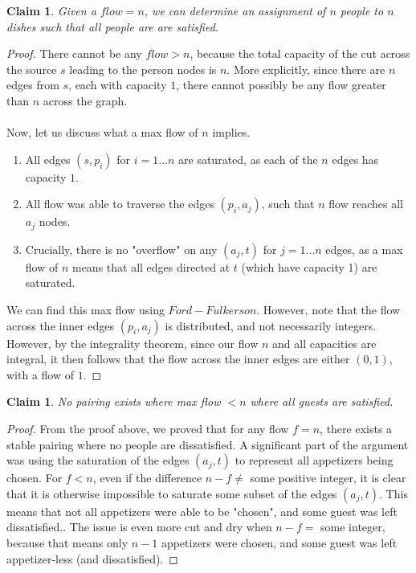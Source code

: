 \documentclass[11pt]{article}
\newtheorem{claim}[theorem]{Claim}
\begin{document}
\begin{claim}
Given a $flow = n$, we can determine an assignment of $n$ people to $n$ dishes such that all people are are satisfied.
\end{claim}

\begin{proof}
There cannot be any $flow > n$, because the total capacity of the cut across the source $s$ leading to the person nodes is $n$. More explicitly, since there are $n$ edges from $s$, each with capacity $1$, there cannot possibly be any flow greater than $n$ across the graph.\\
\\
Now, let us discuss what a max flow of $n$ implies.
\begin{enumerate}
\item All edges $(s, p_i)$ for $i = 1 ... n$ are saturated, as each of the $n$ edges has capacity $1$.
\item All flow was able to traverse the edges $(p_i, a_j)$, such that $n$ flow reaches all $a_j$ nodes.
\item Crucially, there is no "overflow" on any $(a_j, t)$ for $j = 1...n$ edges, as a max flow of $n$ means that all edges directed at $t$ (which have capacity 1) are saturated.
\end{enumerate}

We can find this max flow using $Ford-Fulkerson$. However, note that the flow across the inner edges $(p_i, a_j)$ is distributed, and not necessarily integers. However, by the integrality theorem, since our flow $n$ and all capacities are integral, it then follows that the flow across the inner edges are either $(0, 1)$, with a flow of $1$.
\end{proof}

\begin{claim}
No pairing exists where max flow $< n$ where all guests are satisfied.
\end{claim}
\begin{proof}
From the proof above, we proved that for any flow $f = n$, there exists a stable pairing where no people are dissatisfied. A significant part of the argument was using the saturation of the edges $(a_j, t)$ to represent all appetizers being chosen. For $f < n$, even if the difference $n-f \neq$ some positive integer, it is clear that it is otherwise impossible to saturate some subset of the edges $(a_j, t)$. This means that not all appetizers were able to be "chosen", and some guest was left dissatisfied.. The issue is even more cut and dry when $n-f =$ some integer, because that means only $n-1$ appetizers were chosen, and some guest was left appetizer-less (and dissatisfied). 
\end{proof}
\end{document}
